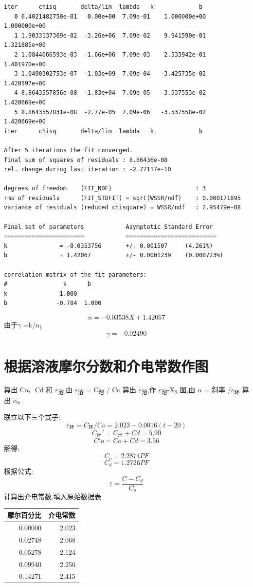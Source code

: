 \documentclass[11pt]{report}
\begin{document}
\begin{verbatim}
iter      chisq       delta/lim  lambda   k             b            
   0 6.4021482750e-01   0.00e+00  7.09e-01    1.000000e+00   1.000000e+00
   1 1.9033137369e-02  -3.26e+06  7.09e-02    9.941590e-01   1.321885e+00
   2 1.0844066593e-03  -1.66e+06  7.09e-03    2.533942e-01   1.401970e+00
   3 1.0490302753e-07  -1.03e+09  7.09e-04   -3.425735e-02   1.420597e+00
   4 8.8643557856e-08  -1.83e+04  7.09e-05   -3.537553e-02   1.420669e+00
   5 8.8643557831e-08  -2.77e-05  7.09e-06   -3.537558e-02   1.420669e+00
iter      chisq       delta/lim  lambda   k             b            

After 5 iterations the fit converged.
final sum of squares of residuals : 8.86436e-08
rel. change during last iteration : -2.77117e-10

degrees of freedom    (FIT_NDF)                        : 3
rms of residuals      (FIT_STDFIT) = sqrt(WSSR/ndf)    : 0.000171895
variance of residuals (reduced chisquare) = WSSR/ndf   : 2.95479e-08

Final set of parameters            Asymptotic Standard Error
=======================            ==========================
k               = -0.0353756       +/- 0.001507     (4.261%)
b               = 1.42067          +/- 0.0001239    (0.008723%)

correlation matrix of the fit parameters:
#                k      b      
k               1.000 
b              -0.784  1.000 

\end{verbatim}

\[
n=-0.03538X+1.42067
\]
由于\(\gamma\) =k/n\textsubscript{1}
\[
\gamma =-0.02490
\]

\section{根据溶液摩尔分数和介电常数作图}
\label{sec:org6a5e971}
算出 Co、Cd 和 \(\varepsilon\)\textsubscript{溶},由 \(\varepsilon\)\textsubscript{溶} = C\textsubscript{溶} / Co 算出  \(\varepsilon\)\textsubscript{溶},作 \(\varepsilon\)\textsubscript{溶}-X\textsubscript{2} 图,由 \(\alpha\) = 斜率 /\(\varepsilon\)\textsubscript{环}
 算出 \(\alpha\)。

联立以下三个式子:
\[
\varepsilon_{环}=C_{环}/Co=2.023-0.0016(t-20)
\]
\[
C_{环}'=C_{环}+Cd =5.90
\]
\[
C'o=Co+Cd=3.56
\]
解得:
\[
C_{o}=2.2874PF
\]
\[
C_{d}=1.2726PF
\]
根据公式:
\[
\varepsilon=\frac{C-C_{d}}{C_{o}}
\]
计算出介电常数,填入原始数据表
\begin{center}
\begin{tabular}{rr}
摩尔百分比 & 介电常数\\
\hline
0.00000 & 2.023\\
0.02748 & 2.068\\
0.05278 & 2.124\\
0.09940 & 2.256\\
0.14271 & 2.415\\
\end{tabular}
\end{center}
\end{document}
